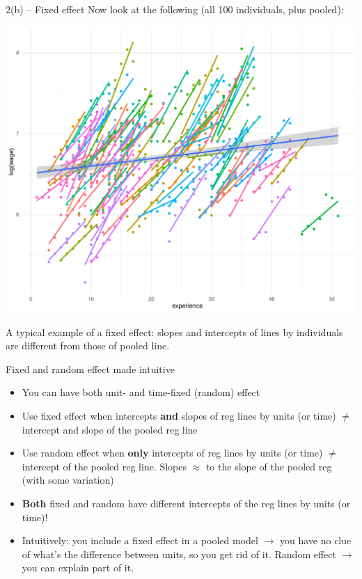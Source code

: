 \documentclass[xcolor=table,dvipsnames]{beamer}
\begin{document}
\begin{frame}{2(b) -- Fixed effect}
Now look at the following (all 100 individuals, plus pooled):
\begin{center}
\includegraphics[scale=0.31]{pictures/week_23_fixed_effect.pdf}
\end{center} \pause
A typical example of a fixed effect: slopes and intercepts of lines by individuals are different from those of pooled line.
\end{frame}

\begin{frame}{Fixed and random effect made intuitive}
\begin{itemize}
\item You can have both unit- and time-fixed (random) effect \pause
\item Use fixed effect when intercepts \textbf{and} slopes of reg lines by units (or time) $\neq$ intercept and slope of the pooled reg line \pause
\item Use random effect when \textbf{only} intercepts of reg lines by units (or time) $\neq$ intercept of the pooled reg line. Slopes $\approx$ to the slope of the pooled reg (with some variation) \pause 
\item \textbf{Both} fixed and random have different intercepts of the reg lines by units (or time)! \pause
\item Intuitively: you include a fixed effect in a pooled model $\rightarrow$ you have no clue of what's the difference between units, so you get rid of it. \pause Random effect $\rightarrow$ you can explain part of it.
\end{itemize}
\end{frame}
\end{document}
